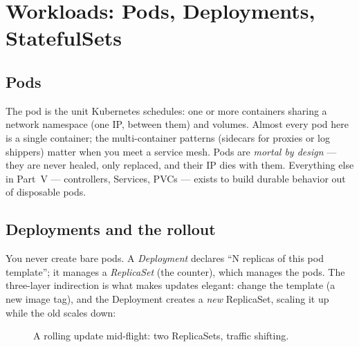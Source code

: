 \chapter{Workloads: Pods, Deployments, StatefulSets}
\label{ch:workloads}

\section{Pods}

The pod is the unit Kubernetes schedules: one or more containers sharing
a network namespace (one IP,  between them) and volumes.
Almost every pod here is a single container; the multi-container
patterns (sidecars for proxies or log shippers) matter when you meet a
service mesh. Pods are \emph{mortal by design} --- they are never healed,
only replaced, and their IP dies with them. Everything else in Part~V
--- controllers, Services, PVCs --- exists to build durable behavior out
of disposable pods.

\section{Deployments and the rollout}

You never create bare pods. A \emph{Deployment} declares ``N replicas
of this pod template''; it manages a \emph{ReplicaSet} (the counter),
which manages the pods. The three-layer indirection is what makes
updates elegant: change the template (a new image tag), and the
Deployment creates a \emph{new} ReplicaSet, scaling it up while the old
scales down:

\begin{figure}[h]
\centering
{}
\caption{A rolling update mid-flight: two ReplicaSets, traffic shifting.}
\end{figure}


